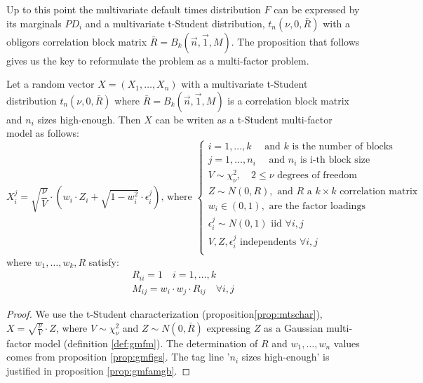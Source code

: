 \documentclass[11pt,fleqn]{book} %
\begin{document}
Up to this point the multivariate default times distribution $F$ can 
be expressed by its marginals $PD_i$ and a multivariate t-Student 
distribution, $t_n(\nu,0,\bar{R})$ with a obligors correlation block 
matrix $\bar{R} = B_k(\vec{n},\vec{1},M)$. The proposition that follows 
gives us the key to reformulate the problem as a multi-factor problem.

\begin{proposition}
	\label{prop:tmfm}
	Let a random vector $X=(X_1,\dots,X_n)$ with a multivariate t-Student 
	distribution $t_n(\nu,0,\bar{R})$ where $\bar{R} = B_k(\vec{n},\vec{1},M)$ 
	is a correlation block matrix and $n_i$ sizes high-enough. 
	Then $X$ can be writen as a t-Student multi-factor model as follows:
	\begin{displaymath}
		X_i^j = \sqrt{\frac{\nu}{V}} \cdot 
		\left( w_i \cdot Z_i + \sqrt{1-w_i^2} \cdot \epsilon_i^j \right)
		\text{, where } \left\{
		\begin{array}{l}
			i = 1, \dots, k \quad \text{ and $k$ is the number of blocks}    \\
			j = 1, \dots, n_i \quad \text{ and $n_i$ is i-th block size}     \\
			V \sim \chi_{\nu}^2, \quad 2 \le \nu \text{ degrees of freedom}  \\
			Z \sim N(0,R), \text{ and $R$ a $k {\times} k$ correlation matrix} \\
			w_i \in (0,1), \text{ are the factor loadings }                  \\
			\epsilon_i^j \sim N(0,1) \text { iid } \forall i,j               \\
			V, Z, \epsilon_i^j \text{ independents } \forall i,j             \\
		\end{array}
		\right.
	\end{displaymath}
	where $w_1,\dots,w_k, R$ satisfy:
	\begin{displaymath}
		\begin{array}{l}
			R_{ii} = 1 \quad i = 1,\dots,k \\
			M_{ij} = w_i \cdot w_j \cdot R_{ij} \quad \forall i,j
		\end{array}
	\end{displaymath}
\end{proposition}
\begin{proof}
	We use the t-Student characterization (proposition\ref{prop:mtschar}),
	$X = \sqrt{\frac{\nu}{V}} \cdot Z$, where $V \sim \chi_{\nu}^2$ and 
	$Z \sim N(0,\bar{R})$ expressing $Z$ as a Gaussian multi-factor model 
	(definition \ref{def:gmfm}). The determination of $R$ and $w_1,\dots,w_n$
	values comes from proposition \ref{prop:gmfigs}. The tag line '$n_i$ sizes
	high-enough' is justified in proposition \ref{prop:gmfamgb}.
\end{proof}
\end{document}

